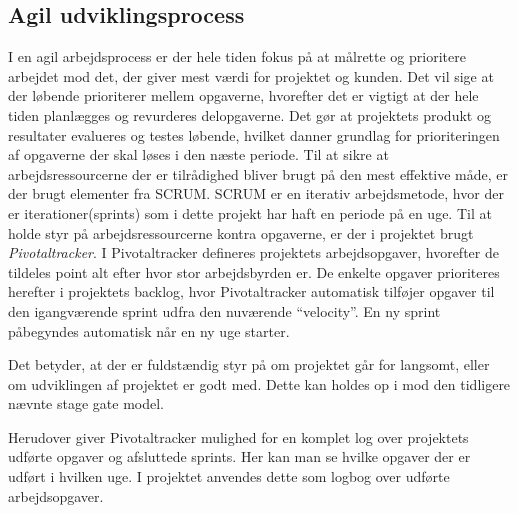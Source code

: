 


\subsection{Agil udviklingsprocess}
I en agil arbejdsprocess er der hele tiden fokus på at målrette og prioritere arbejdet mod det, der giver mest værdi for projektet og kunden. Det vil sige at der løbende prioriterer mellem opgaverne, hvorefter det er vigtigt at der hele tiden planlægges og revurderes delopgaverne. Det gør at projektets produkt og resultater evalueres og testes løbende, hvilket danner grundlag for prioriteringen af opgaverne der skal løses i den næste periode. Til at sikre at arbejdsressourcerne der er tilrådighed bliver brugt på den mest effektive måde, er der brugt elementer fra SCRUM. SCRUM er en iterativ arbejdsmetode, hvor  der er iterationer(sprints) som i dette projekt har haft en periode på en uge. Til at holde styr på arbejdsressourcerne kontra opgaverne, er der i projektet brugt \textit{Pivotaltracker}. 
I Pivotaltracker defineres projektets arbejdsopgaver, hvorefter de tildeles point alt efter hvor stor arbejdsbyrden er. De enkelte opgaver prioriteres herefter i projektets backlog, hvor Pivotaltracker automatisk tilføjer opgaver til den igangværende sprint udfra den nuværende “velocity”. En ny sprint påbegyndes automatisk når en ny uge starter.

Det betyder, at der er fuldstændig styr på om projektet går for langsomt, eller om udviklingen af projektet er godt med. Dette kan holdes op i mod den tidligere nævnte stage gate model.

Herudover giver Pivotaltracker mulighed for en komplet log over projektets udførte opgaver og afsluttede sprints. Her kan man se hvilke opgaver der er udført i hvilken uge. I projektet anvendes dette som logbog over udførte arbejdsopgaver.

